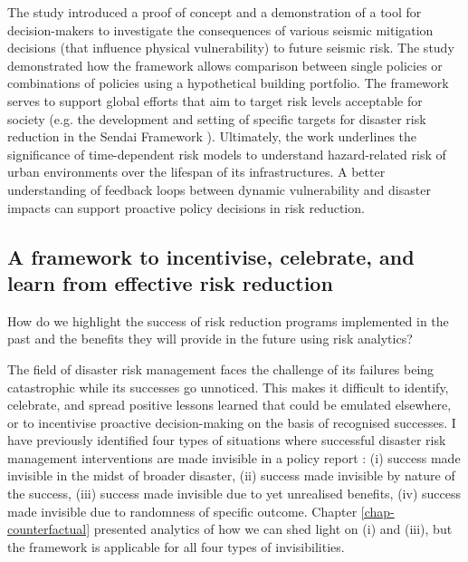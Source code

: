 The study introduced a proof of concept and a demonstration of a tool for decision-makers to investigate the consequences of various seismic mitigation decisions (that influence physical vulnerability) to future seismic risk. The study demonstrated how the framework allows comparison between single policies or combinations of policies using a hypothetical building portfolio. The framework serves to support global efforts that aim to target risk levels acceptable for society (e.g. the development and setting of specific targets for disaster risk reduction in the Sendai Framework \citep{unisdr_2015}). Ultimately, the work underlines the significance of time-dependent risk models to understand hazard-related risk of urban environments over the lifespan of its infrastructures. A better understanding of feedback loops between dynamic vulnerability and disaster impacts can support proactive policy decisions in risk reduction. 


\subsection{A framework to incentivise, celebrate, and learn from effective risk reduction}

\begin{center} \begin{blockquote}
How do we highlight the success of risk reduction programs implemented in the past and the benefits they will provide in the future using risk analytics?
\end{blockquote} \end{center}

The field of disaster risk management faces the challenge of its failures being catastrophic while its successes go unnoticed. This makes it difficult to identify, celebrate, and spread positive lessons learned that could be emulated elsewhere, or to incentivise proactive decision-making on the basis of recognised successes. I have previously identified four types of situations where successful disaster risk management interventions are made invisible in a policy report \citep{lallemant_rabonza_gar_2022}: (i) success made invisible in the midst of broader disaster, (ii) success made invisible by nature of the success, (iii) success made invisible due to yet unrealised benefits, (iv) success made invisible due to randomness of specific outcome. Chapter \ref{chap-counterfactual} presented analytics of how we can shed light on (i) and (iii), but the framework is applicable for all four types of invisibilities.

